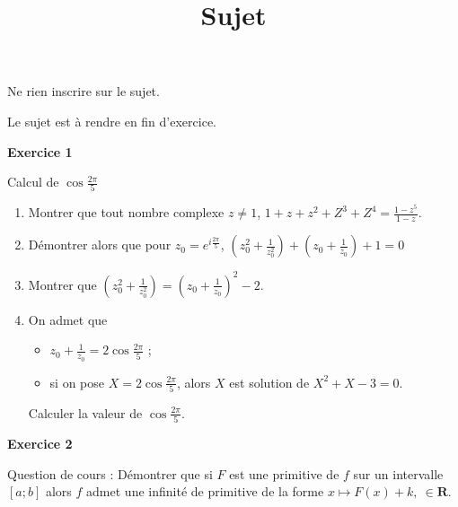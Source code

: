\documentclass[12pt,a4paper,french]{article}
\author{}
\title{Sujet \no{13}}
\date{}
\begin{document}
\maketitle
\begin{center}Ne rien inscrire sur le sujet.

  Le sujet est à rendre en fin d'exercice.
\end{center}

\bigskip

\textbf{Exercice 1}

Calcul de $\cos\frac{2\pi}{5}$

\begin{enumerate}
  \item Montrer que tout nombre complexe $z\neq 1$, $1 + z + z^2 + Z^3 +
    Z^4 = \frac{1 - z^5}{1 - z}$.
  \item Démontrer alors que pour $z_0 = e^{i\frac{2\pi}5}$, $\left(z_0^2
    + \frac1{z_0^2} \right) + \left(z_0 + \frac1{z_0}\right) + 1 = 0$
  \item Montrer que $\left(z_0^2 + \frac1{z_0^2} \right) = \left(z_0 +
    \frac1{z_0}\right)^2 - 2$.
  \item On admet que
    \begin{itemize}
      \item $z_0 + \frac1{z_0} = 2\cos\frac{2\pi}5$ ;
      \item si on pose $X = 2\cos\frac{2\pi}5$, alors $X$ est solution
        de $X^2 + X - 3 = 0$.
    \end{itemize}
    Calculer la valeur de $\cos\frac{2\pi}5$.
\end{enumerate}

\medskip

\textbf{Exercice 2}

Question de cours : Démontrer que si $F$ est une primitive de $f$ sur un
intervalle $[a;b]$ alors $f$ admet une infinité de primitive de la forme
$x\mapsto F(x) + k,\ \in\mathbf{R}$.
\end{document}
